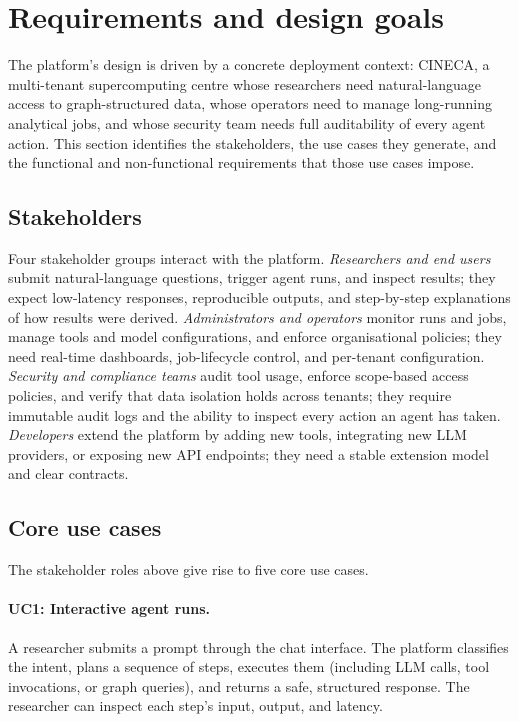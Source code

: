 \documentclass[a4paper]{sapthesis}
\begin{document}
\section{Requirements and design goals}
\label{sec:requirements}

The platform's design is driven by a concrete deployment context: CINECA, a
multi-tenant supercomputing centre whose researchers need natural-language
access to graph-structured data, whose operators need to manage long-running
analytical jobs, and whose security team needs full auditability of every
agent action.  This section identifies the stakeholders, the use cases
they generate, and the functional and non-functional requirements that
those use cases impose.

\subsection{Stakeholders}

Four stakeholder groups interact with the platform.  \emph{Researchers and
end users} submit natural-language questions, trigger agent runs, and
inspect results; they expect low-latency responses, reproducible outputs,
and step-by-step explanations of how results were derived.
\emph{Administrators and operators} monitor runs and jobs, manage tools and
model configurations, and enforce organisational policies; they need
real-time dashboards, job-lifecycle control, and per-tenant configuration.
\emph{Security and compliance teams} audit tool usage, enforce scope-based
access policies, and verify that data isolation holds across tenants; they
require immutable audit logs and the ability to inspect every action
an agent has taken.  \emph{Developers} extend the platform by adding new
tools, integrating new LLM providers, or exposing new API endpoints; they
need a stable extension model and clear contracts.

\subsection{Core use cases}
\label{sec:use-cases}

The stakeholder roles above give rise to five core use cases.

\paragraph{UC1: Interactive agent runs.}
A researcher submits a prompt through the chat interface.  The platform
classifies the intent, plans a sequence of steps, executes them (including
LLM calls, tool invocations, or graph queries), and returns a safe,
structured response.  The researcher can inspect each step's input, output,
and latency.
\end{document}
